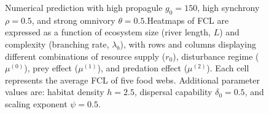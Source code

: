 \begin{figure}
\centering
{}
\caption{Numerical prediction with high propagule \(g_0 = 150\), high
synchrony \(\rho = 0.5\), and strong omnivory \(\theta = 0.5\).Heatmaps
of FCL are expressed as a function of ecosystem size (river length,
\(L\)) and complexity (branching rate, \(\lambda_b\)), with rows and
columns displaying different combinations of resource supply (\(r_0\)),
disturbance regime (\(\mu^{(0)}\)), prey effect (\(\mu^{(1)}\)), and
predation effect (\(\mu^{(2)}\)). Each cell represents the average FCL
of five food webs. Additional parameter values are: habitat density
\(h=2.5\), dispersal capability \(\delta_0=0.5\), and scaling exponent
\(\psi=0.5\).}
\end{figure}

\newpage
